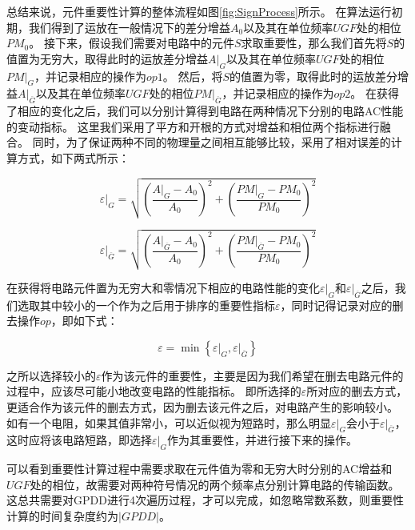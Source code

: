 总结来说，元件重要性计算的整体流程如图\ref{fig:SignProcess}所示。
在算法运行初期，我们得到了运放在一般情况下的差分增益$A_0$以及其在单位频率$UGF$处的相位$PM_0$。
接下来，假设我们需要对电路中的元件$S$求取重要性，那么我们首先将$S$的值置为无穷大，取得此时的运放差分增益$A|_G$以及其在单位频率$UGF$处的相位$PM|_G$，并记录相应的操作为$op1$。
然后，将$S$的值置为零，取得此时的运放差分增益$A|_{\overline G}$以及其在单位频率$UGF$处的相位$PM|_{\overline G}$，并记录相应的操作为$op2$。
在获得了相应的变化之后，我们可以分别计算得到电路在两种情况下分别的电路AC性能的变动指标。
这里我们采用了平方和开根的方式对增益和相位两个指标进行融合。
同时，为了保证两种不同的物理量之间相互能够比较，采用了相对误差的计算方式，如下两式所示：

\begin{equation}
\varepsilon {|_G} = \sqrt {{{\left( {\frac{{A{|_G} - {A_0}}}
				{{{A_0}}}} \right)}^2} + {{\left( {\frac{{PM{|_G} - P{M_0}}}
				{{P{M_0}}}} \right)}^2}}
\end{equation}

\begin{equation}
\varepsilon {|_{\overline G }} = \sqrt {{{\left( {\frac{{A{|_{\overline G }} - {A_0}}}
				{{{A_0}}}} \right)}^2} + {{\left( {\frac{{PM{|_{\overline G }} - P{M_0}}}
				{{P{M_0}}}} \right)}^2}}
\end{equation}

在获得将电路元件置为无穷大和零情况下相应的电路性能的变化$\varepsilon {|_G}$和$\varepsilon {|_{\overline G }}$之后，我们选取其中较小的一个作为之后用于排序的重要性指标$\varepsilon$，同时记得记录对应的删去操作$op$，即如下式：

\begin{equation}
\varepsilon  = \min \left\{ {{\varepsilon {|_G}},{\varepsilon {|_{\overline G }}}} \right\}
\end{equation}

之所以选择较小的$\varepsilon$作为该元件的重要性，主要是因为我们希望在删去电路元件的过程中，应该尽可能小地改变电路的性能指标。
即所选择的$\varepsilon$所对应的删去方式，更适合作为该元件的删去方式，因为删去该元件之后，对电路产生的影响较小。
如有一个电阻，如果其值非常小，可以近似视为短路时，那么明显$\varepsilon {|_G}$会小于$\varepsilon {|_{\overline G }}$，这时应将该电路短路，即选择$\varepsilon {|_G}$作为其重要性，并进行接下来的操作。

可以看到重要性计算过程中需要求取在元件值为零和无穷大时分别的AC增益和$UGF$处的相位，故需要对两种符号情况的两个频率点分别计算电路的传输函数。
这总共需要对GPDD进行4次遍历过程，才可以完成，如忽略常数系数，则重要性计算的时间复杂度约为$\left|GPDD\right|$。

